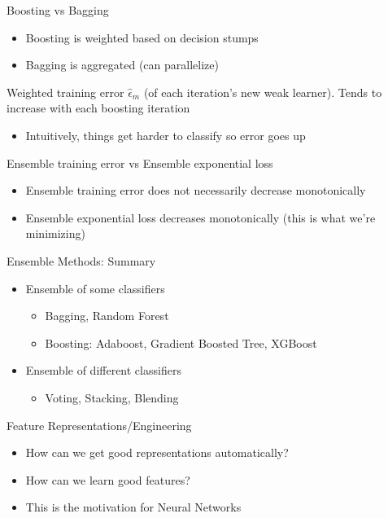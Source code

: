 \documentclass[10pt, oneside]{article}
\begin{document}
Boosting vs Bagging
\begin{itemize}
    \item Boosting is weighted based on decision stumps
    \item Bagging is aggregated (can parallelize)
\end{itemize}
Weighted training error $\hat \epsilon_m$ (of each iteration's new weak learner). Tends to increase with each boosting iteration
\begin{itemize}
    \item Intuitively, things get harder to classify so error goes up   
\end{itemize}
Ensemble training error vs Ensemble exponential loss
\begin{itemize}
    \item Ensemble training error does not necessarily decrease monotonically
    \item Ensemble exponential loss decreases monotonically (this is what we're minimizing)
\end{itemize}
Ensemble Methods: Summary
\begin{itemize}
    \item Ensemble of some classifiers
    \begin{itemize}
        \item Bagging, Random Forest
        \item Boosting: Adaboost, Gradient Boosted Tree, XGBoost
    \end{itemize}
    \item Ensemble of different classifiers
    \begin{itemize}
        \item Voting, Stacking, Blending
    \end{itemize}
\end{itemize}

Feature Representations/Engineering
\begin{itemize}
    \item How can we get good representations automatically?
    \item How can we learn good features?
    \item This is the motivation for Neural Networks
\end{itemize}
\end{document}
